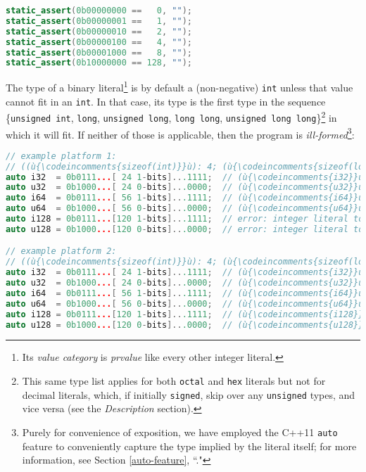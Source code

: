 \begin{lstlisting}[language=C++]
static_assert(0b00000000 ==   0, "");
static_assert(0b00000001 ==   1, "");
static_assert(0b00000010 ==   2, "");
static_assert(0b00000100 ==   4, "");
static_assert(0b00001000 ==   8, "");
static_assert(0b10000000 == 128, "");
\end{lstlisting}


\noindent The type of a binary literal{\cprotect\footnote{Its \emph{value
category} is \emph{prvalue} like every other integer literal.}} is by
default a (non-negative) \texttt{int} unless that value cannot fit in an
\texttt{int}. In that case, its type is the first type in the sequence
\{\texttt{unsigned}~\texttt{int}, \texttt{long},
\texttt{unsigned}~\texttt{long}, \texttt{long}~\texttt{long},
\texttt{unsigned}~\texttt{long}~\texttt{long}\}{\cprotect\footnote{This
same type list applies for both \texttt{octal} and \texttt{hex}
literals but not for decimal literals, which, if initially
\texttt{signed}, skip over any \texttt{unsigned} types, and vice versa
(see the \textit{Description} section).}} in which it will fit. If neither of those is applicable, then the program is
\emph{ill-formed}{\cprotect\footnote{Purely for convenience of
exposition, we have employed the C++11 \texttt{auto} feature to
conveniently capture the type implied by the literal itself; for more
information, see Section \ref{auto-feature}, ``."}}:

\begin{lstlisting}[language=C++]
// example platform 1:
// ((ù{\codeincomments{sizeof(int)}}ù): 4; (ù{\codeincomments{sizeof(long)}}ù): 4; (ù{\codeincomments{sizeof(long long)}}ù): 8)
auto i32  = 0b0111...[ 24 1-bits]...1111;  // (ù{\codeincomments{i32}}ù) is (ù{\codeincomments{int}}ù).
auto u32  = 0b1000...[ 24 0-bits]...0000;  // (ù{\codeincomments{u32}}ù) is (ù{\codeincomments{unsigned int}}ù).
auto i64  = 0b0111...[ 56 1-bits]...1111;  // (ù{\codeincomments{i64}}ù) is (ù{\codeincomments{long long}}ù).
auto u64  = 0b1000...[ 56 0-bits]...0000;  // (ù{\codeincomments{u64}}ù) is (ù{\codeincomments{unsigned long long}}ù).
auto i128 = 0b0111...[120 1-bits]...1111;  // error: integer literal too large
auto u128 = 0b1000...[120 0-bits]...0000;  // error: integer literal too large

// example platform 2:
// ((ù{\codeincomments{sizeof(int)}}ù): 4; (ù{\codeincomments{sizeof(long)}}ù): 8; (ù{\codeincomments{sizeof(long long)}}ù): 16)
auto i32  = 0b0111...[ 24 1-bits]...1111;  // (ù{\codeincomments{i32}}ù)  is (ù{\codeincomments{int}}ù).
auto u32  = 0b1000...[ 24 0-bits]...0000;  // (ù{\codeincomments{u32}}ù)  is (ù{\codeincomments{unsigned int}}ù).
auto i64  = 0b0111...[ 56 1-bits]...1111;  // (ù{\codeincomments{i64}}ù)  is (ù{\codeincomments{long}}ù).
auto u64  = 0b1000...[ 56 0-bits]...0000;  // (ù{\codeincomments{u64}}ù)  is (ù{\codeincomments{unsigned long}}ù).
auto i128 = 0b0111...[120 1-bits]...1111;  // (ù{\codeincomments{i128}}ù) is (ù{\codeincomments{long long}}ù).
auto u128 = 0b1000...[120 0-bits]...0000;  // (ù{\codeincomments{u128}}ù) is (ù{\codeincomments{unsigned long long}}ù).
\end{lstlisting}


